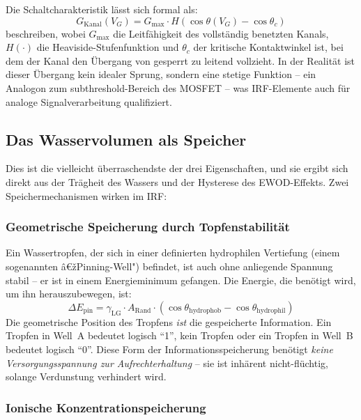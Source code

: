 ﻿\documentclass[a4paper,12pt]{scrreprt}
\theoremstyle{definition}
\begin{document}
Die Schaltcharakteristik lässt sich formal als:
\begin{equation}
	G_{\mathrm{Kanal}}(V_G) = G_{\max} \cdot H\!\left(\cos\theta(V_G) - \cos\theta_c\right)
	\label{eq:schaltcharakteristik}
\end{equation}
beschreiben, wobei $G_{\max}$ die Leitfähigkeit des vollständig benetzten
Kanals, $H(\cdot)$ die Heaviside-Stufenfunktion und $\theta_c$ der kritische
Kontaktwinkel ist, bei dem der Kanal den Übergang von gesperrt zu leitend
vollzieht. In der Realität ist dieser Übergang kein idealer Sprung, sondern
eine stetige Funktion -- ein Analogon zum subthreshold-Bereich des MOSFET --
was IRF-Elemente auch für analoge Signalverarbeitung qualifiziert.

\subsection{Das Wasservolumen als Speicher}

Dies ist die vielleicht überraschendste der drei Eigenschaften, und sie
ergibt sich direkt aus der Trägheit des Wassers und der Hysterese des
EWOD-Effekts. Zwei Speichermechanismen wirken im IRF:

\subsubsection{Geometrische Speicherung durch Topfenstabilität}

Ein Wassertropfen, der sich in einer definierten hydrophilen Vertiefung
(einem sogenannten â€žPinning-Well") befindet, ist auch ohne anliegende
Spannung stabil -- er ist in einem Energieminimum gefangen. Die Energie,
die benötigt wird, um ihn herauszubewegen, ist:
\begin{equation}
	\Delta E_{\mathrm{pin}} = \gamma_{\mathrm{LG}} \cdot A_{\mathrm{Rand}} \cdot
	(\cos\theta_{\mathrm{hydrophob}} - \cos\theta_{\mathrm{hydrophil}})
	\label{eq:pinning_energie}
\end{equation}
Die geometrische Position des Tropfens \emph{ist} die gespeicherte Information.
Ein Tropfen in Well~A bedeutet logisch ``1'', kein Tropfen oder ein Tropfen
in Well~B bedeutet logisch ``0''. Diese Form der Informationsspeicherung
benötigt \emph{keine Versorgungsspannung zur Aufrechterhaltung} -- sie ist
inhärent nicht-flüchtig, solange Verdunstung verhindert wird.

\subsubsection{Ionische Konzentrationspeicherung}
\end{document}
